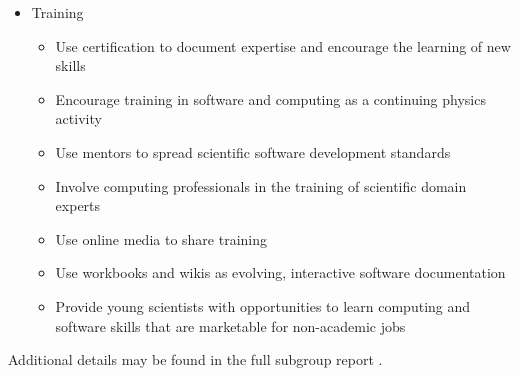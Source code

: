 \begin{itemize}
    \item Training
    \begin{itemize}
        \item Use certification to document expertise and encourage the learning of
new skills
        \item Encourage training in software and computing as a continuing physics activity
        \item Use mentors to spread scientific software development standards
        \item Involve computing professionals in the training of scientific domain experts
        \item Use online media to share training
        \item Use workbooks and wikis as evolving, interactive software documentation
        \item Provide young scientists with opportunities to learn computing and software skills that are marketable for non-academic jobs
    \end{itemize}

\end{itemize}

Additional details may be found in the full subgroup report \cite{Brown:2013hwa}.

